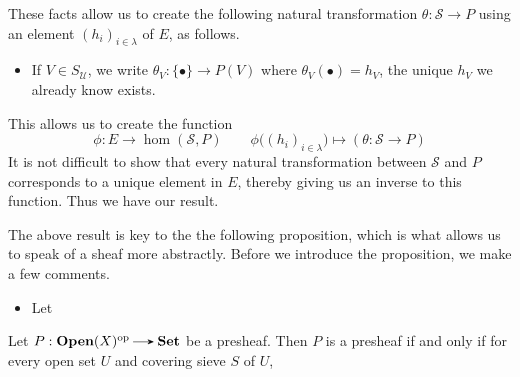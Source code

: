 \begin{prf}
    These facts allow us to create the following natural transformation 
    $\theta: \mathcal{S} \to P$ using an element $(h_i)_{i \in \lambda}$ of $E$, 
    as follows. 
    \begin{itemize}
        \item If $V \in S_{\mathcal{U}}$, we write $\theta_V: \{\bullet\} \to P(V)$ 
        where $\theta_V(\bullet) = h_V$, the unique $h_V$ we already know exists. 
    \end{itemize}
    This allows us to create the function 
    \[
        \phi: E \to \hom(\mathcal{S}, P) \qquad \phi\Big( (h_i)_{i \in \lambda} \Big) \mapsto (\theta: \mathcal{S} \to P)
    \]
    It is not difficult to show that every natural transformation between $\mathcal{S}$ and $P$ 
    corresponds to a unique element in $E$, thereby giving us an inverse to this function. Thus we have 
    our result.
\end{prf}

The above result is key to the the following proposition, which is what allows us 
to speak of a sheaf more abstractly. Before we introduce the proposition, we make a few 
comments.
\begin{itemize}
    \item Let 
\end{itemize}

\begin{proposition}
    Let $P: \textbf{Open}(X)\op \to \textbf{Set}$ be a presheaf. 
    Then $P$ is a presheaf if and only if
    for every open set $U$ and covering sieve $S$ of $U$, 
\end{proposition}



\newpage
